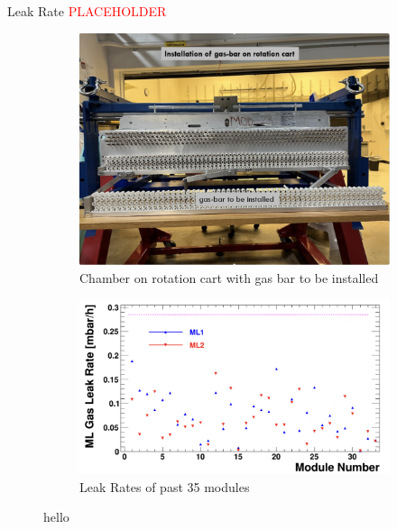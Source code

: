 \documentclass{beamer}
\def\ph{\textcolor{red}{PLACEHOLDER}}
\begin{document}
		\begin{frame}{Leak Rate \ph}
			\begin{figure}
				\centering	
				\begin{subfigure}[c]{0.35\pdfpagewidth}
					\includegraphics[width=0.35\pdfpagewidth]{GasBar.png}
					\caption{Chamber on rotation cart with gas bar to be installed}
				\end{subfigure}
				\hfill
				\begin{subfigure}[c]{0.4\pdfpagewidth}
					\includegraphics[width=0.4\pdfpagewidth]{ChamberLeakRate.png}
					\caption{Leak Rates of past 35 modules}
				\end{subfigure}
				\caption{hello}
			\end{figure}
		\end{frame}
\end{document}
